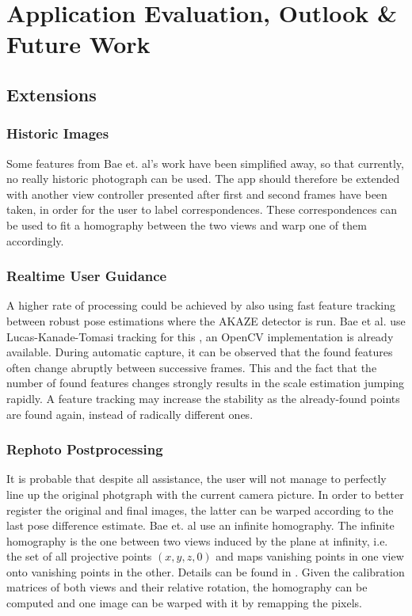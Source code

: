 \chapter{Application Evaluation, Outlook \& Future Work}\label{ch:outlook}

\section{Extensions}

\subsection*{Historic Images}

Some features from Bae et. al's work have been simplified away, so that
currently, no really historic photograph can be used. The app should therefore
be extended with another view controller presented after first and second frames
have been taken, in order for the user to label correspondences. These
correspondences can be used to fit a homography between the two views and warp
one of them accordingly.

\subsection*{Realtime User Guidance}

A higher rate of processing could be achieved by also using fast feature
tracking between robust pose estimations where the AKAZE detector is run. Bae et
al. use Lucas-Kanade-Tomasi tracking for this \citep{lucas1981,tomasi1991}, an
OpenCV implementation is already available. During automatic capture, it can be
observed that the found features often change abruptly between successive
frames. This and the fact that the number of found features changes strongly
results in the scale estimation jumping rapidly. A feature tracking may increase
the stability as the already-found points are found again, instead of radically
different ones.

\subsection*{Rephoto Postprocessing}

It is probable that despite all assistance, the user will not manage to
perfectly line up the original photgraph with the current camera picture.  In
order to better register the original and final images, the latter can be warped
according to the last pose difference estimate. Bae et. al use an infinite
homography. The infinite homography is the one between two views induced by the
plane at infinity, i.e.  the set of all projective points $(x,y,z,0)$ and maps
vanishing points in one view onto vanishing points in the other. Details can be
found in \citep[ch. 13.4]{h&z2004}.  Given the calibration matrices of both
views and their relative rotation, the homography can be computed and one image
can be warped with it by remapping the pixels.

